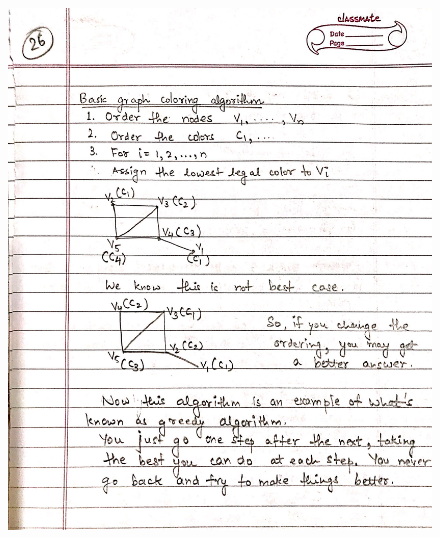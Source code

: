 \begin{figure}[H]
    \centering
    \includegraphics[scale=0.25]{"./MIT 6.042J/MIT_6042J_026"}
\end{figure}
\newpage
